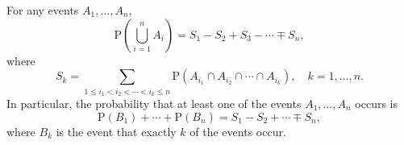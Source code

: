 For any events $A_1, \ldots, A_n$,
$$\text{P}\left(\bigcup_{i=1}^{n} A_i\right) = S_1 - S_2 + S_3 - \cdots \mp S_n,$$
where
$$S_k = \sum_{1 \leq i_1 < i_2 < \cdots < i_k \leq n} \text{P}(A_{i_1} \cap A_{i_2} \cap \cdots \cap A_{i_k}), \quad k = 1, \ldots, n.$$
In particular, the probability that at least one of the events $A_1, \ldots, A_n$ occurs is
$$\text{P}(B_1) + \cdots + \text{P}(B_n) = S_1 - S_2 + \cdots \mp S_n,$$
where $B_k$ is the event that exactly $k$ of the events occur.
